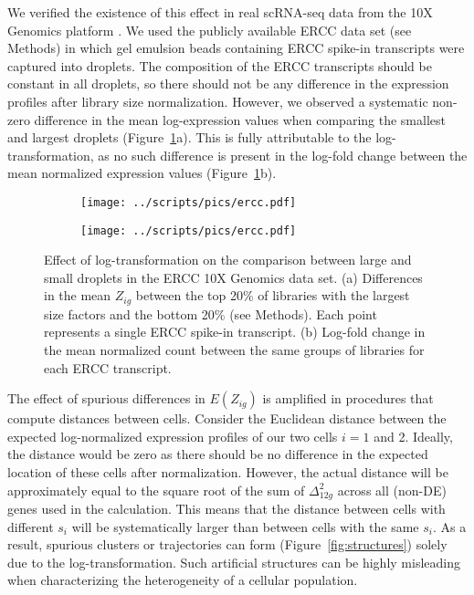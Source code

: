\documentclass[10pt,letterpaper]{article}
\begin{document}
We verified the existence of this effect in real scRNA-seq data from the 10X Genomics platform \cite{zheng2017massively}.
We used the publicly available ERCC data set (see Methods) in which gel emulsion beads containing ERCC spike-in transcripts were captured into droplets.
The composition of the ERCC transcripts should be constant in all droplets, so there should not be any difference in the expression profiles after library size normalization.
However, we observed a systematic non-zero difference in the mean log-expression values when comparing the smallest and largest droplets (Figure~\ref{fig:ercc}a).
This is fully attributable to the log-transformation, as no such difference is present in the log-fold change between the mean normalized expression values (Figure~\ref{fig:ercc}b).

\begin{figure}
\centering
\begin{subfigure}[b]{0.49\textwidth}
    \texttt{[image: ../scripts/pics/ercc.pdf]}
    \caption{}
\end{subfigure}
\begin{subfigure}[b]{0.49\textwidth}
    \texttt{[image: ../scripts/pics/ercc.pdf]}
    \caption{}
\end{subfigure}
\caption{Effect of log-transformation on the comparison between large and small droplets in the ERCC 10X Genomics data set.
(a) Differences in the mean $Z_{ig}$ between the top 20\% of libraries with the largest size factors and the bottom 20\% (see Methods).
Each point represents a single ERCC spike-in transcript.
(b) Log-fold change in the mean normalized count between the same groups of libraries for each ERCC transcript.}
\label{fig:ercc}
\end{figure}

The effect of spurious differences in $E(Z_{ig})$ is amplified in procedures that compute distances between cells.
Consider the Euclidean distance between the expected log-normalized expression profiles of our two cells $i=1$ and 2.
Ideally, the distance would be zero as there should be no difference in the expected location of these cells after normalization.
However, the actual distance will be approximately equal to the square root of the sum of $\Delta_{12g}^2$ across all (non-DE) genes used in the calculation.
This means that the distance between cells with different $s_i$ will be systematically larger than between cells with the same $s_i$.
As a result, spurious clusters or trajectories can form (Figure~\ref{fig:structures}) solely due to the log-transformation.
Such artificial structures can be highly misleading when characterizing the heterogeneity of a cellular population.
\end{document}

